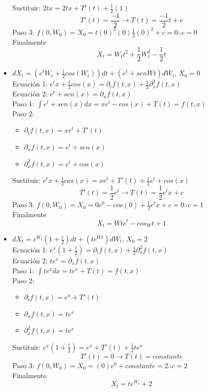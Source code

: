 \documentclass[11pt,fleqn]{book} %
\numberwithin{equation}{section} %
\numberwithin{figure}{section} %
\numberwithin{table}{section} %
\begin{document}
\begin{itemize}
    Sustituir: $ 2tx = 2tx + T'(t) + \frac{1}{2}(1)   $
    $$ T'(t) = \frac{-1}{2} \rightarrow T(t) = \frac{-1}{2}t + c   $$
    Paso 3: $  f(0,W_{0}) = X_{0} =  t(0)^{2}(0) \frac{1}{2} (0)^{2} + c = 0 \therefore c= 0 $
    \ \\%
    Finalmente
    $$ X_{t} = W_{t}t^{2} + \frac{1}{2} W_{t}^{2} - \frac{1}{2} t    $$
    \item $dX_{t} = (e^{t} W_{t} + \frac{1}{2} cos(W_{t}))dt + (e^{t} + senW{t})dW_{t}$, $X_{0} = 0$
    \ \\%
    Ecuación 1: $ e^{t} x + \frac{1}{2} cos(x) = \partial_{t} f(t,x) + \frac{1}{2} \partial^{2}_{x} f(t,x)    $
    \ \\%
    Ecuación 2: $  e^{t} + sen(x)   = \partial_{x} f(t,x)   $
    \ \\%
    Paso 1: $ \int e^{t} + sen(x) dx = xe^{t} - cos(x) + T(t)   = f(t,x) $
    \ \\%
    Paso 2: 
    \begin{itemize}
        \item $ \partial_{t} f(t,x) = xe^{t} + T'(t)   $
        \item $ \partial_{x} f(t,x) = e^{t} + sen(x)  $
        \item $ \partial^{2}_{x} f(t,x) = e^{t} + cos(x)  $
    \end{itemize}
    Sustituir: $ e^{t} x + \frac{1}{2} cos(x) = xe^{t} + T'(t) + \frac{1}{2} e^{t} + cos(x) $
    $$ T'(t) = \frac{1}{2} e^{t} \rightarrow T(t) = \frac{1}{2} e^{t}x + c   $$
    Paso 3: $  f(0,W_{0}) = X_{0} = 0e^{0} - cos(0) + \frac{1}{2} e^{t}x + c = 0  \therefore c=1 $
    \ \\%
    Finalmente
    $$ X_{t} = W{t}e^{t} - cos_W{t} + 1   $$
    \item $dX_{t} = e^{W_{t}}(1 + \frac{t}{2})dt + (t e^{W{t}})dW_{t}$, $X_{0} = 2$
    \ \\%
    Ecuación 1: $ e^{x}(1 + \frac{t}{2})    = \partial_{t} f(t,x) + \frac{1}{2} \partial^{2}_{x} f(t,x)    $
    \ \\%
    Ecuación 2: $ t e^{x}    = \partial_{x} f(t,x)   $
    \ \\%
    Paso 1: $ \int t e^{x} dx  =  t e^{x} + T(t)  = f(t,x) $
    \ \\%
    Paso 2: 
    \begin{itemize}
        \item $ \partial_{t} f(t,x) = e^{x} + T'(t)   $
        \item $ \partial_{x} f(t,x) = t e^{x} $
        \item $ \partial^{2}_{x} f(t,x) = t e^{x}   $
    \end{itemize}
    Sustituir: $ e^{x}(1 + \frac{t}{2}) = e^{x} + T'(t) + \frac{1}{2} t e^{x}   $
    $$ T'(t) = 0   \rightarrow T(t) = constante   $$
    Paso 3: $  f(0,W_{0}) = X_{0} = (0)e^{0}+ constante = 2                   \therefore c= 2 $
    \ \\%
    Finalmente
    $$ X_{t} = te^{W_{t}} + 2   $$
\end{itemize}
\end{document}

